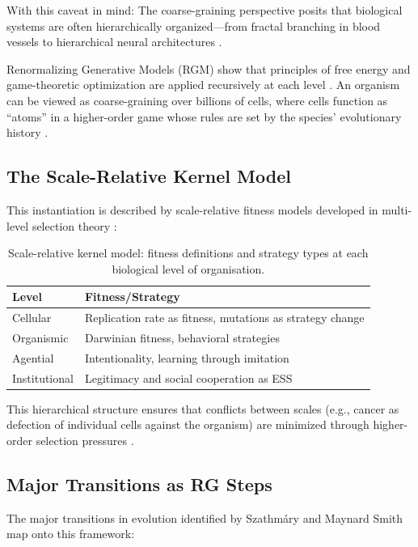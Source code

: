 \documentclass[12pt,a4paper]{article}
\theoremstyle{remark}
\begin{document}
With this caveat in mind: The coarse-graining perspective posits that biological systems are often hierarchically organized---from fractal branching in blood vessels to hierarchical neural architectures \citep{SelfSimilarNetworks}.

Renormalizing Generative Models (RGM) show that principles of free energy and game-theoretic optimization are applied recursively at each level \citep{ScaleRGFrontiers}. An organism can be viewed as coarse-graining over billions of cells, where cells function as ``atoms'' in a higher-order game whose rules are set by the species' evolutionary history \citep{ReplicatorOptimization}.

\subsection{The Scale-Relative Kernel Model}

This instantiation is described by scale-relative fitness models developed in multi-level selection theory \citep{Okasha2006,Michod1999,ReplicatorOptimization}:

\begin{table}[htbp]
\centering
\caption{Scale-relative kernel model: fitness definitions and strategy types at each biological level of organisation.}
\label{tab:scale-kernel}
\begin{tabular}{ll}
\toprule
\textbf{Level} & \textbf{Fitness/Strategy} \\
\midrule
Cellular & Replication rate as fitness, mutations as strategy change \\
Organismic & Darwinian fitness, behavioral strategies \\
Agential & Intentionality, learning through imitation \\
Institutional & Legitimacy and social cooperation as ESS \\
\bottomrule
\end{tabular}
\end{table}

This hierarchical structure ensures that conflicts between scales (e.g., cancer as defection of individual cells against the organism) are minimized through higher-order selection pressures \citep{ReplicatorOptimization}.

\subsection{Major Transitions as RG Steps}

The major transitions in evolution identified by Szathm\'ary and Maynard Smith \citep{SzathmaryMaynardSmith1995} map onto this framework:
\end{document}
